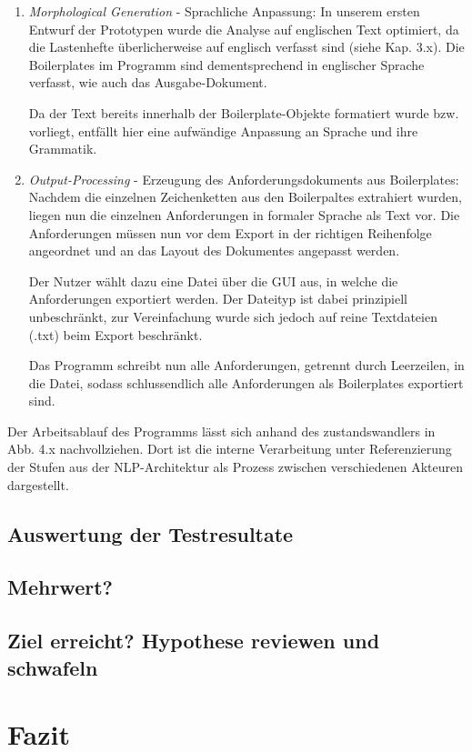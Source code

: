 \documentclass[12pt]{report}
\begin{document}
\begin{enumerate}
\item \textit{Morphological Generation} - Sprachliche Anpassung: In unserem ersten Entwurf der Prototypen wurde die Analyse auf englischen Text optimiert, da die Lastenhefte überlicherweise auf englisch verfasst sind (siehe Kap. 3.x). Die Boilerplates im Programm sind dementsprechend in englischer Sprache verfasst, wie auch das Ausgabe-Dokument.

Da der Text bereits innerhalb der Boilerplate-Objekte formatiert wurde bzw. vorliegt, entfällt hier eine aufwändige Anpassung an Sprache und ihre Grammatik.

\item \textit{Output-Processing} - Erzeugung des Anforderungsdokuments aus Boilerplates: Nachdem die einzelnen Zeichenketten aus den Boilerpaltes extrahiert wurden, liegen nun die einzelnen Anforderungen in formaler Sprache als Text vor. Die Anforderungen müssen nun vor dem Export in der richtigen Reihenfolge angeordnet und an das Layout des Dokumentes angepasst werden.

Der Nutzer wählt dazu eine Datei über die GUI aus, in welche die Anforderungen exportiert werden. Der Dateityp ist dabei prinzipiell unbeschränkt, zur Vereinfachung wurde sich jedoch auf reine Textdateien (.txt) beim Export beschränkt. 

Das Programm schreibt nun alle Anforderungen, getrennt durch Leerzeilen, in die Datei, sodass schlussendlich alle Anforderungen als Boilerplates exportiert sind.
\end{enumerate}

Der Arbeitsablauf des Programms lässt sich anhand des zustandswandlers in Abb. 4.x nachvollziehen. Dort ist die interne Verarbeitung unter Referenzierung der Stufen aus der NLP-Architektur als Prozess zwischen verschiedenen Akteuren dargestellt.
\section{Auswertung der Testresultate}
\section{Mehrwert?}
\section{Ziel erreicht? Hypothese reviewen und schwafeln}
\chapter{Fazit}
\end{document}
